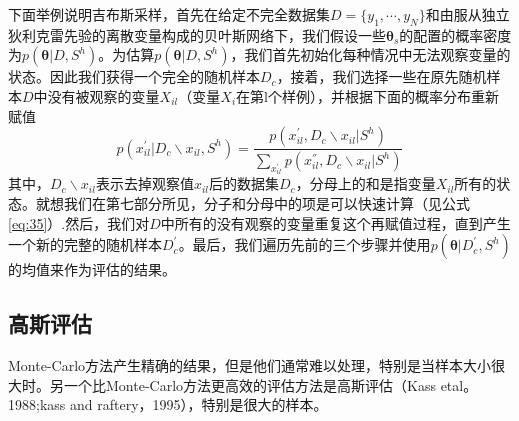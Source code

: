 \documentclass[10pt,a4paper]{article}
\begin{document}
\begin{CJK*}{UTF8}{gkai}
下面举例说明吉布斯采样，首先在给定不完全数据集$D=\{y_1,\cdots,y_N\}$和由服从独立狄利克雷先验的离散变量构成的贝叶斯网络下，我们假设一些$\boldsymbol{\theta}_s$的配置的概率密度为$p(\boldsymbol{\theta}|D,S^h)$。为估算$p(\boldsymbol{\theta}|D,S^h)$，我们首先初始化每种情况中无法观察变量的状态。因此我们获得一个完全的随机样本$D_c$，接着，我们选择一些在原先随机样本$D$中没有被观察的变量$X_{il}$（变量$X_i$在第l个样例），并根据下面的概率分布重新赋值
\begin{equation}
p(x_{il}^{'}|D_c\backslash x_{il},S^h)=
\frac{p(x_{il}^{'},D_c\backslash x_{il}|S^h)}
{\sum_{x_{il}^{'}} p(x_{il}^{''},D_c\backslash x_{il}|S^h)} \nonumber
\end{equation}
其中，$D_c\backslash x_{il}$表示去掉观察值$x_{il}$后的数据集$D_c$，分母上的和是指变量$X_{il}$所有的状态。就想我们在第七部分所见，分子和分母中的项是可以快速计算（见公式\ref{eq:35}）.然后，我们对$D$中所有的没有观察的变量重复这个再赋值过程，直到产生一个新的完整的随机样本$D_c^{'}$。最后，我们遍历先前的三个步骤并使用$p(\boldsymbol{\theta}|D_c^{'},S^h)$的均值来作为评估的结果。


\subsection{高斯评估}
Monte-Carlo方法产生精确的结果，但是他们通常难以处理，特别是当样本大小很大时。另一个比Monte-Carlo方法更高效的评估方法是高斯评估（Kass etal。1988;kass and raftery，1995），特别是很大的样本。



\end{CJK*}
\end{document}
